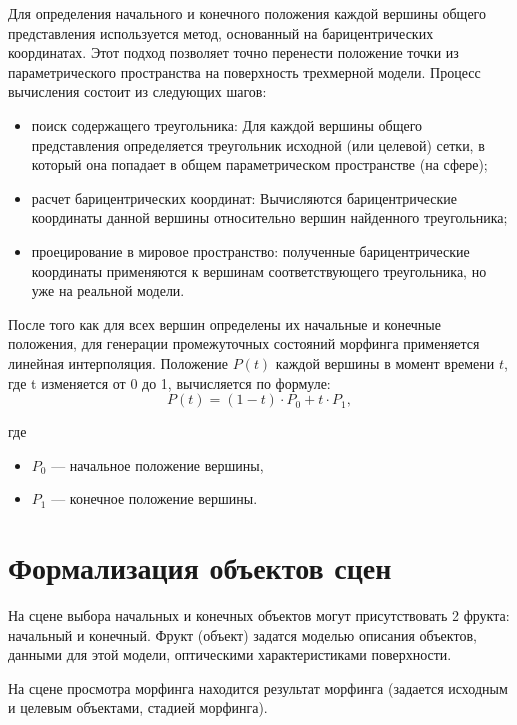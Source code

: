     Для определения начального и конечного положения каждой вершины общего представления используется метод, основанный на барицентрических координатах. Этот подход позволяет точно перенести положение точки из параметрического пространства на поверхность трехмерной модели.
    Процесс вычисления состоит из следующих шагов:
    \begin{itemize}
        \item поиск содержащего треугольника: Для каждой вершины общего представления определяется треугольник исходной (или целевой) сетки, в который она попадает в общем параметрическом пространстве (на сфере);
        \item расчет барицентрических координат: Вычисляются барицентрические координаты данной вершины относительно вершин найденного треугольника;
        \item проецирование в мировое пространство: полученные барицентрические координаты применяются к вершинам соответствующего треугольника, но уже на реальной модели.
    \end{itemize}

    После того как для всех вершин определены их начальные и конечные положения, для генерации промежуточных состояний морфинга применяется линейная интерполяция. Положение $P(t)$ каждой вершины в момент времени $t$, где t изменяется от 0 до 1, вычисляется по формуле:
    \begin{equation}
        P(t) = (1 - t) \cdot P_0 + t \cdot P_1,
    \end{equation}

    где
    \begin{itemize}
        \item $P_0$ --- начальное положение вершины,
        \item $P_1$ --- конечное положение вершины.
    \end{itemize}
    
    \section{Формализация объектов сцен}
    
    На сцене выбора начальных и конечных объектов могут присутствовать 2 фрукта: начальный и конечный. Фрукт (объект) задатся моделью описания объектов, данными для этой модели, оптическими характеристиками поверхности.
    
    На сцене просмотра морфинга находится результат морфинга (задается исходным и целевым объектами, стадией морфинга). 
    
